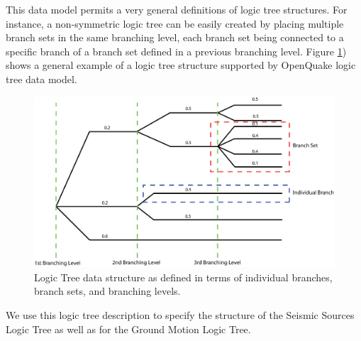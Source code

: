 This data model permits a very general definitions of logic tree 
structures. For instance, a non-symmetric logic tree can be easily 
created by placing multiple branch sets in the same branching level, each 
branch set being connected to a specific branch of a branch set defined in a
previous branching level. Figure \ref{fig:LogicTreeGeneralStructure}) shows a 
general example of a logic tree structure supported by OpenQuake logic tree 
data model. 

\begin{figure}
\includegraphics[width=15cm]{./Figures/Part_Hazard/LogicTreeGeneralStructure.eps}
\caption{Logic Tree data structure as defined in terms of individual branches, 
branch sets, and branching levels.}
\label{fig:LogicTreeGeneralStructure}
\end{figure}

We use this logic tree description to specify the structure of the Seismic 
Sources Logic Tree as well as for the Ground Motion Logic Tree. 